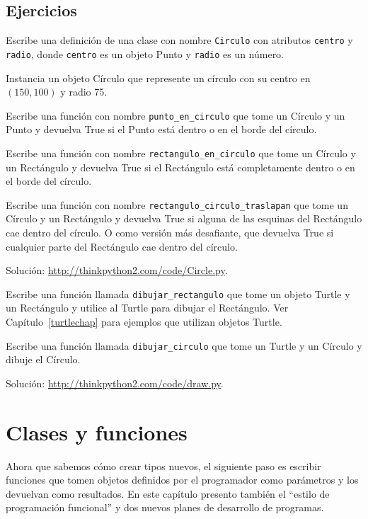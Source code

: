\documentclass[10pt]{book}
\begin{document}
\section{Ejercicios}

\begin{exercise}

Escribe una definición de una clase con nombre {\tt Circulo} con atributos
{\tt centro} y {\tt radio}, donde {\tt centro} es un objeto Punto
y {\tt radio} es un número.

Instancia un objeto Círculo que represente un círculo con su centro
en $(150, 100)$ y radio 75.

Escribe una función con nombre \verb"punto_en_circulo" que tome un Círculo y
un Punto y devuelva True si el Punto está dentro o en el borde del
círculo.

Escribe una función con nombre \verb"rectangulo_en_circulo" que tome un Círculo y un
Rectángulo y devuelva True si el Rectángulo está completamente dentro o en el borde
del círculo.

Escribe una función con nombre \verb"rectangulo_circulo_traslapan" que tome un Círculo
y un Rectángulo y devuelva True si alguna de las esquinas del Rectángulo cae
dentro del círculo.  O como versión más desafiante, que devuelva True si
cualquier parte del Rectángulo cae dentro del círculo.

Solución: \url{http://thinkpython2.com/code/Circle.py}.

\end{exercise}


\begin{exercise}

Escribe una función llamada \verb"dibujar_rectangulo" que tome un objeto Turtle
y un Rectángulo y utilice al Turtle para dibujar el Rectángulo.  Ver
Capítulo~\ref{turtlechap} para ejemplos que utilizan objetos Turtle.

Escribe una función llamada \verb"dibujar_circulo" que tome un Turtle y
un Círculo y dibuje el Círculo.

Solución: \url{http://thinkpython2.com/code/draw.py}.

\end{exercise}



\chapter{Clases y funciones}
\label{time}

Ahora que sabemos cómo crear tipos nuevos, el siguiente
paso es escribir funciones que tomen objetos definidos por el programador
como parámetros y los devuelvan como resultados.  En este capítulo
presento también el ``estilo de programación funcional'' y dos nuevos
planes de desarrollo de programas.
\end{document}
